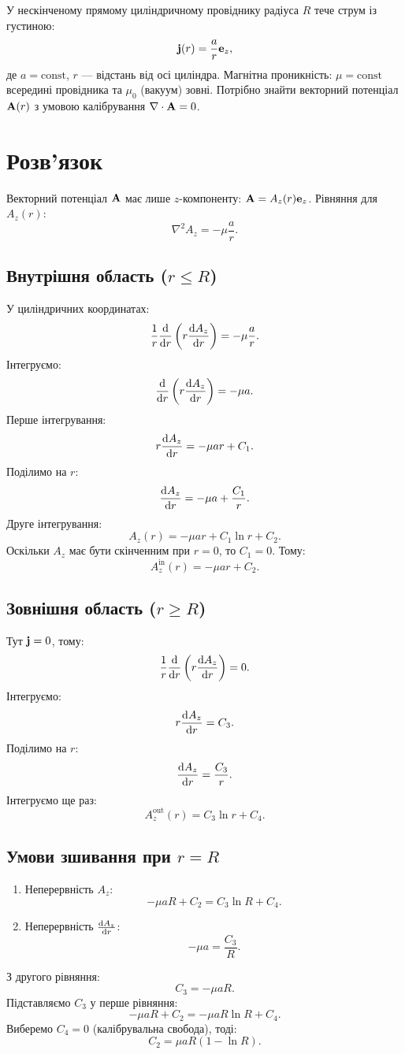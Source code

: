 \documentclass{article}
\begin{document}
У нескінченому прямому циліндричному провіднику радіуса \( R \) тече струм із густиною:
\[
\vb{j}(r) = \frac{a}{r} \vb{e}_z,
\]
де \( a = \text{const} \), \( r \) — відстань від осі циліндра. Магнітна проникність: \( \mu =
\text{const} \) всередині провідника та \( \mu_0 \) (вакуум) зовні. Потрібно знайти векторний
потенціал \( \vb{A}(r) \) з умовою калібрування \( \nabla\cdot \vb{A} = 0 \).

\section{Розв'язок}
Векторний потенціал \( \vb{A} \) має лише \( z \)-компоненту: \( \vb{A} = A_z(r) \vb{e}_z \). Рівняння
для \( A_z(r) \):
\[
\nabla^2 A_z = -\mu \frac{a}{r}.
\]

\subsection{Внутрішня область (\( r \leq R \))}
У циліндричних координатах:
\[
\frac{1}{r} \dv{r} \left( r \dv{A_z}{r} \right) = -\mu \frac{a}{r}.
\]
Інтегруємо:
\[
\dv{r} \left( r \dv{A_z}{r} \right) = -\mu a.
\]
Перше інтегрування:
\[
r \dv{A_z}{r} = -\mu a r + C_1.
\]
Поділимо на \( r \):
\[
\dv{A_z}{r} = -\mu a + \frac{C_1}{r}.
\]
Друге інтегрування:
\[
A_z(r) = -\mu a r + C_1 \ln r + C_2.
\]
Оскільки \( A_z \) має бути скінченним при \( r = 0 \), то \( C_1 = 0 \). Тому:
\[
A_z^{\text{in}}(r) = -\mu a r + C_2.
\]

\subsection{Зовнішня область (\( r \geq R \))}
Тут \( \vb{j} = 0 \), тому:
\[
\frac{1}{r} \dv{r} \left( r \dv{A_z}{r} \right) = 0.
\]
Інтегруємо:
\[
r \dv{A_z}{r} = C_3.
\]
Поділимо на \( r \):
\[
\dv{A_z}{r} = \frac{C_3}{r}.
\]
Інтегруємо ще раз:
\[
A_z^{\text{out}}(r) = C_3 \ln r + C_4.
\]

\subsection{Умови зшивання при \( r = R \)}
\begin{enumerate}
    \item Неперервність \( A_z \):
    \[
    -\mu a R + C_2 = C_3 \ln R + C_4.
    \]
    \item Неперервність \( \dv{A_z}{r} \):
    \[
    -\mu a = \frac{C_3}{R}.
    \]
\end{enumerate}
З другого рівняння:
\[
C_3 = -\mu a R.
\]
Підставляємо \( C_3 \) у перше рівняння:
\[
-\mu a R + C_2 = -\mu a R \ln R + C_4.
\]
Виберемо \( C_4 = 0 \) (калібрувальна свобода), тоді:
\[
C_2 = \mu a R (1 - \ln R).
\]
\end{document}
